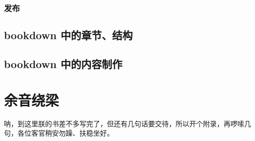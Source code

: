 \documentclass[]{ctexbook}
\begin{document}
\hypertarget{ux53d1ux5e03}{%
\subsection{发布}\label{ux53d1ux5e03}}

\hypertarget{bookdown-ux4e2dux7684ux7ae0ux8282ux7ed3ux6784}{%
\section{bookdown 中的章节、结构}\label{bookdown-ux4e2dux7684ux7ae0ux8282ux7ed3ux6784}}

\hypertarget{bookdown-ux4e2dux7684ux5185ux5bb9ux5236ux4f5c}{%
\section{bookdown 中的内容制作}\label{bookdown-ux4e2dux7684ux5185ux5bb9ux5236ux4f5c}}

\cleardoublepage

\hypertarget{appendix-ux9644ux5f55}{%
\appendix {}}


\hypertarget{sound}{%
\chapter{余音绕梁}\label{sound}}

呐，到这里朕的书差不多写完了，但还有几句话要交待，所以开个附录，再啰嗦几句，各位客官稍安勿躁、扶稳坐好。



\backmatter
\printindex
\end{document}
